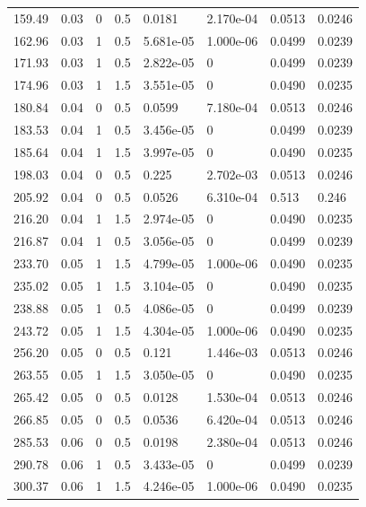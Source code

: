 \documentclass[preview]{standalone}
\begin{document}
{{\begin{tabular}{L{1.2cm}C{1.2cm} C{0.3cm}C{0.5cm} C{1.4cm}C{1.4cm} C{1.4cm}C{1.4cm}}
  159.49  &  0.03  & 0     & 0.5 &  0.0181  & 2.170e-04  & 0.0513 &  0.0246   \\ 
  162.96  &  0.03  & 1     & 0.5 &  5.681e-05  & 1.000e-06  & 0.0499 &  0.0239   \\ 
  171.93  &  0.03  & 1     & 0.5 &  2.822e-05  & 0  & 0.0499 &  0.0239   \\ 
  174.96  &  0.03  & 1     & 1.5 &  3.551e-05  & 0  & 0.0490 &  0.0235   \\ 
  180.84  &  0.04  & 0     & 0.5 &  0.0599  & 7.180e-04  & 0.0513 &  0.0246   \\ 
  183.53  &  0.04  & 1     & 0.5 &  3.456e-05  & 0  & 0.0499 &  0.0239   \\ 
  185.64  &  0.04  & 1     & 1.5 &  3.997e-05  & 0  & 0.0490 &  0.0235   \\ 
  198.03  &  0.04  & 0     & 0.5 &  0.225  & 2.702e-03  & 0.0513 &  0.0246   \\ 
  205.92  &  0.04  & 0     & 0.5 &  0.0526  & 6.310e-04  & 0.513 &  0.246   \\ 
  216.20  &  0.04  & 1     & 1.5 &  2.974e-05  & 0  & 0.0490 &  0.0235   \\ 
  216.87  &  0.04  & 1     & 0.5 &  3.056e-05  & 0  & 0.0499 &  0.0239   \\ 
  233.70  &  0.05  & 1     & 1.5 &  4.799e-05  & 1.000e-06  & 0.0490 &  0.0235   \\ 
  235.02  &  0.05  & 1     & 1.5 &  3.104e-05  & 0  & 0.0490 &  0.0235   \\ 
  238.88  &  0.05  & 1     & 0.5 &  4.086e-05  & 0  & 0.0499 &  0.0239   \\ 
  243.72  &  0.05  & 1     & 1.5 &  4.304e-05  & 1.000e-06  & 0.0490 &  0.0235   \\ 
  256.20  &  0.05  & 0     & 0.5 &  0.121  & 1.446e-03  & 0.0513 &  0.0246   \\ 
  263.55  &  0.05  & 1     & 1.5 &  3.050e-05  & 0  & 0.0490 &  0.0235   \\ 
  265.42  &  0.05  & 0     & 0.5 &  0.0128  & 1.530e-04  & 0.0513 &  0.0246   \\ 
  266.85  &  0.05  & 0     & 0.5 &  0.0536  & 6.420e-04  & 0.0513 &  0.0246   \\ 
  285.53  &  0.06  & 0     & 0.5 &  0.0198  & 2.380e-04  & 0.0513 &  0.0246   \\ 
  290.78  &  0.06  & 1     & 0.5 &  3.433e-05  & 0  & 0.0499 &  0.0239   \\ 
  300.37  &  0.06  & 1     & 1.5 &  4.246e-05  & 1.000e-06  & 0.0490 &  0.0235   \\ 

\end{tabular}}}
\end{document}
